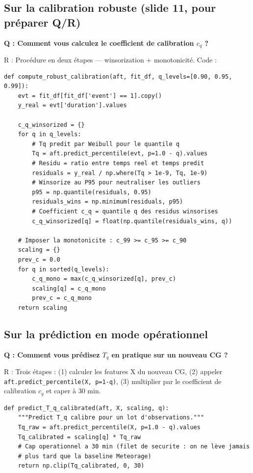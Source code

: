 \documentclass[11pt,a4paper]{article}
\begin{document}
\subsection*{Sur la calibration robuste (slide 11, pour préparer Q/R)}

\begin{piege}
\textbf{Q : Comment vous calculez le coefficient de calibration $c_q$ ?}

R : Procédure en deux étapes — winsorization + monotonicité. Code :
\end{piege}

\begin{lstlisting}[caption={Calibration robuste (compute\_robust\_calibration).}]
def compute_robust_calibration(aft, fit_df, q_levels=[0.90, 0.95, 0.99]):
    evt = fit_df[fit_df['event'] == 1].copy()
    y_real = evt['duration'].values

    c_q_winsorized = {}
    for q in q_levels:
        # Tq predit par Weibull pour le quantile q
        Tq = aft.predict_percentile(evt, p=1.0 - q).values
        # Residu = ratio entre temps reel et temps predit
        residuals = y_real / np.where(Tq > 1e-9, Tq, 1e-9)
        # Winsorize au P95 pour neutraliser les outliers
        p95 = np.quantile(residuals, 0.95)
        residuals_wins = np.minimum(residuals, p95)
        # Coefficient c_q = quantile q des residus winsorises
        c_q_winsorized[q] = float(np.quantile(residuals_wins, q))

    # Imposer la monotonicite : c_99 >= c_95 >= c_90
    scaling = {}
    prev_c = 0.0
    for q in sorted(q_levels):
        c_q_mono = max(c_q_winsorized[q], prev_c)
        scaling[q] = c_q_mono
        prev_c = c_q_mono
    return scaling
\end{lstlisting}

\subsection*{Sur la prédiction en mode opérationnel}

\begin{piege}
\textbf{Q : Comment vous prédisez $T_q$ en pratique sur un nouveau CG ?}

R : Trois étapes : (1) calculer les features X du nouveau CG, (2) appeler
\texttt{aft.predict\_percentile(X, p=1-q)}, (3) multiplier par le coefficient de
calibration $c_q$ et caper à 30 min.
\end{piege}

\begin{lstlisting}[caption={Prediction operationnelle finale.}]
def predict_T_q_calibrated(aft, X, scaling, q):
    """Predict T_q calibre pour un lot d'observations."""
    Tq_raw = aft.predict_percentile(X, p=1.0 - q).values
    Tq_calibrated = scaling[q] * Tq_raw
    # Cap operationnel a 30 min (filet de securite : on ne lève jamais
    # plus tard que la baseline Meteorage)
    return np.clip(Tq_calibrated, 0, 30)
\end{lstlisting}
\end{document}
